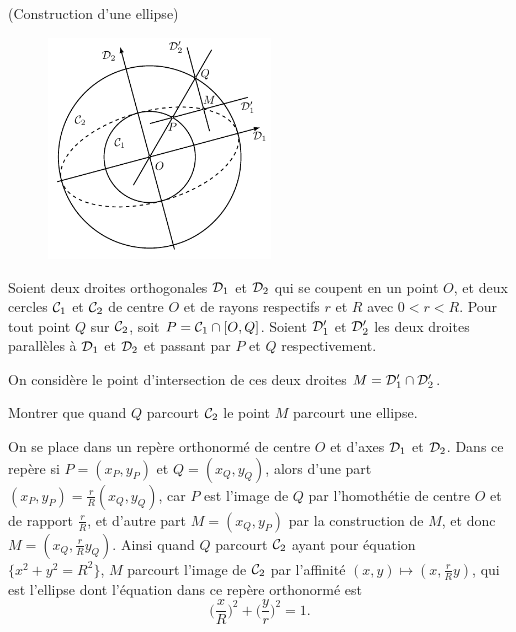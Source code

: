 \documentclass[a4paper,12pt,reqno]{amsart}
\begin{document}
\begin{exo} (Construction d'une ellipse)

  \begin{figure}
    \centering\vspace{-14mm}
    \includegraphics[width=59mm]{img_ellipse_cercles}
    \centering\vspace{-14mm}
  \end{figure}
  Soient deux droites orthogonales $\mathcal{D}_{1}$ et $\mathcal{D}_{2}$ qui se coupent en un point $O$, et deux cercles $\mathcal{C}_{1}$ et $\mathcal{C}_{2}$ de centre $O$ et de rayons respectifs $r$ et $R$ avec $0<r<R$.\newline
  Pour tout point $Q$ sur $\mathcal{C}_{2}$, soit $P=\mathcal{C}_{1}\cap [O,Q]$.
  Soient $\mathcal{D}'_{1}$ et $\mathcal{D}'_{2}$ les deux droites parallèles à $\mathcal{D}_{1}$ et $\mathcal{D}_{2}$ et passant par $P$ et $Q$ respectivement.

  On considère le point d'intersection de ces deux droites $M=\mathcal{D}'_{1}\cap \mathcal{D}'_{2}$.

  Montrer que quand $Q$ parcourt $\mathcal{C}_{2}$ le point $M$ parcourt une ellipse.

\end{exo}

\begin{solution}

  On se place dans un repère orthonormé de centre $O$ et d'axes $\mathcal{D}_{1}$ et $\mathcal{D}_{2}$. Dans ce repère si $P=(x_{P},y_{P})$ et $Q=(x_{Q},y_{Q})$, alors d'une part $(x_{P},y_{P})=\frac{r}{R}(x_{Q},y_{Q})$, car $P$ est l'image de $Q$ par l'homothétie de centre $O$ et de rapport $\frac{r}{R}$, et d'autre part $M=(x_{Q},y_{P})$ par la construction de $M$, et donc $M=(x_{Q},\frac{r}{R}y_{Q})$.\newline
  Ainsi quand $Q$ parcourt $\mathcal{C}_{2}$ ayant pour équation $\big\{ x^{2}+y^{2}=R^{2} \big\}$, $M$ parcourt l'image de $\mathcal{C}_{2}$ par l'affinité $(x,y)\mapsto(x,\frac{r}{R}y)$, qui est l'ellipse dont l'équation dans ce repère orthonormé est\vspace{-.7\baselineskip}
  \[
    \Big(\frac{x}{R}\Big)^{2}+\Big(\frac{y}{r}\Big)^{2}=1.
  \]
  \vspace{-2\baselineskip}

\end{solution}
\end{document}
